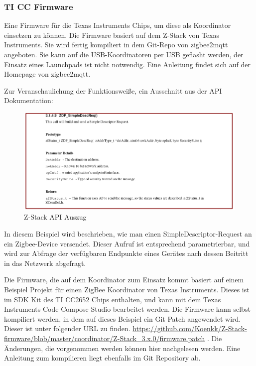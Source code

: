 \subsubsection{TI CC Firmware}

Eine Firmware für die Texas Instruments Chips, um diese als Koordinator einsetzen zu können. Die Firmware basiert auf dem Z-Stack von Texas Instruments. Sie wird fertig kompiliert
in dem Git-Repo von zigbee2mqtt angeboten. Sie kann auf die USB-Koordinatoren per USB geflasht werden, der Einsatz eines Launchpads ist nicht notwendig. Eine Anleitung
findet sich auf der Homepage von zigbee2mqtt.  


Zur Veranschaulichung der Funktionsweiße, ein Ausschnitt aus der API Dokumentation:

\begin{figure}[H]
  \centering
  \includegraphics[width=1\textwidth]{media/z-stack-api-excerpt.png}
  \caption{Z-Stack API Auszug}
\end{figure}

In diesem Beispiel wird beschrieben, wie man einen SimpleDescriptor-Request an ein Zigbee-Device versendet. Dieser Aufruf ist entsprechend parametrierbar,
und wird zur Abfrage der verfügbaren Endpunkte eines Gerätes nach dessen Beitritt in das Netzwerk abgefragt.

Die Firmware, die auf dem Koordinator zum Einsatz kommt basiert auf einem Beispiel Projekt für einen ZigBee Koordinator von Texas Instruments. Dieses ist
im SDK Kit des TI CC2652 Chips enthalten, und kann mit dem Texas Instruments Code Compose Studio bearbeitet werden. Die Firmware kann selbst kompiliert werden,
in dem auf dieses Beispiel ein Git Patch angewendet wird. Dieser ist unter folgender URL zu finden.
\url{https://github.com/Koenkk/Z-Stack-firmware/blob/master/coordinator/Z-Stack_3.x.0/firmware.patch} .
Die Änderungen, die vorgenommen werden können hier nachgelesen werden. Eine Anleitung zum kompilieren liegt ebenfalls im Git Repository ab.

